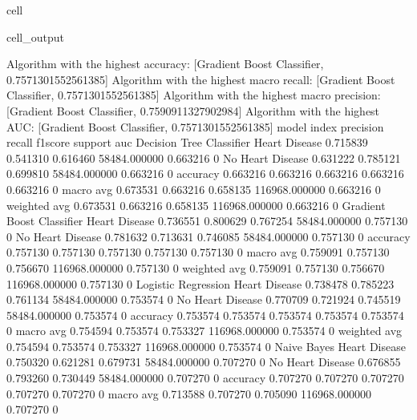 \documentclass[letterpaper,10pt,english]{jupyterBook}
\begin{document}
\begin{sphinxuseclass}{cell}
\begin{sphinxVerbatimOutput}
\begin{sphinxuseclass}{cell_output}
\begin{sphinxVerbatim}[commandchars=\\\{\}]
Algorithm with the highest accuracy: [\PYGZsq{}Gradient Boost Classifier\PYGZsq{}, 0.7571301552561385]
Algorithm with the highest macro recall:
        [\PYGZsq{}Gradient Boost Classifier\PYGZsq{}, 0.7571301552561385]
Algorithm with the highest macro precision:
        [\PYGZsq{}Gradient Boost Classifier\PYGZsq{}, 0.7590911327902984]
Algorithm with the highest AUC:
        [\PYGZsq{}Gradient Boost Classifier\PYGZsq{}, 0.7571301552561385]
model                      index             precision  recall    f1\PYGZhy{}score  support        auc     
Decision Tree Classifier   Heart Disease     0.715839   0.541310  0.616460  58484.000000   0.663216    0
                           No Heart Disease  0.631222   0.785121  0.699810  58484.000000   0.663216    0
                           accuracy          0.663216   0.663216  0.663216  0.663216       0.663216    0
                           macro avg         0.673531   0.663216  0.658135  116968.000000  0.663216    0
                           weighted avg      0.673531   0.663216  0.658135  116968.000000  0.663216    0
Gradient Boost Classifier  Heart Disease     0.736551   0.800629  0.767254  58484.000000   0.757130    0
                           No Heart Disease  0.781632   0.713631  0.746085  58484.000000   0.757130    0
                           accuracy          0.757130   0.757130  0.757130  0.757130       0.757130    0
                           macro avg         0.759091   0.757130  0.756670  116968.000000  0.757130    0
                           weighted avg      0.759091   0.757130  0.756670  116968.000000  0.757130    0
Logistic Regression        Heart Disease     0.738478   0.785223  0.761134  58484.000000   0.753574    0
                           No Heart Disease  0.770709   0.721924  0.745519  58484.000000   0.753574    0
                           accuracy          0.753574   0.753574  0.753574  0.753574       0.753574    0
                           macro avg         0.754594   0.753574  0.753327  116968.000000  0.753574    0
                           weighted avg      0.754594   0.753574  0.753327  116968.000000  0.753574    0
Naive Bayes                Heart Disease     0.750320   0.621281  0.679731  58484.000000   0.707270    0
                           No Heart Disease  0.676855   0.793260  0.730449  58484.000000   0.707270    0
                           accuracy          0.707270   0.707270  0.707270  0.707270       0.707270    0
                           macro avg         0.713588   0.707270  0.705090  116968.000000  0.707270    0

\end{sphinxVerbatim}
\end{sphinxuseclass}
\end{sphinxVerbatimOutput}
\end{sphinxuseclass}
\end{document}
